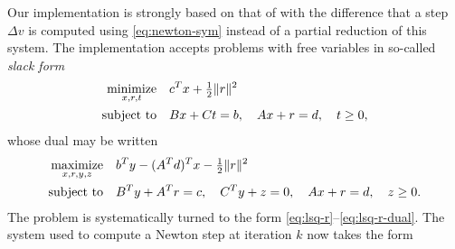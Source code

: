 \documentclass{amsart}
\begin{document}
Our implementation is strongly based on that of \cite{friedlander-orban-2012}
with the difference that a step $\Delta v$ is computed using
\eqref{eq:newton-sym} instead of a partial reduction of this system. The
implementation accepts problems with free variables in so-called \textit{slack
form}
\begin{equation}
  \label{eq:lsq-r-slack}
  \begin{aligned}
    \displaystyle\mathop{\textup{minimize}}_{x, r, t} \quad & c^T x + \tfrac{1}{2} \|r\|^2 \\
    \mathop{\textup{subject to}} \quad & Bx + Ct = b, \quad Ax + r = d, \quad t \geq 0,
  \end{aligned}
\end{equation}
whose dual may be written
\begin{equation}
  \label{eq:lsq-r-slack-dual}
  \begin{aligned}
    \displaystyle\mathop{\textup{maximize}}_{x, r, y, z} \quad & b^T y - (A^T d)^T x - \tfrac{1}{2} \|r\|^2 \\
    \mathop{\textup{subject to}} \quad & B^T y + A^T r = c, \quad
                C^T y + z = 0, \quad
                Ax + r = d, \quad z \geq 0.
  \end{aligned}
\end{equation}
The problem is systematically turned to the form
\eqref{eq:lsq-r}--\eqref{eq:lsq-r-dual}. The system used to compute a Newton
step at iteration $k$ now takes the form
\end{document}

